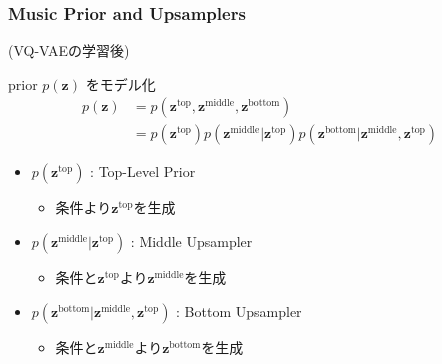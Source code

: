 \documentclass[dvipdfmx]{beamer}
\begin{document}
\begin{frame}
    \frametitle{Music Prior and Upsamplers}
    (VQ-VAEの学習後)
    \vspace{\baselineskip}

    prior $p(\bm{z})$ をモデル化
    \begin{align}
        p(\bm{z}) &= p(\bm{z}^{\mathrm{top}}, \bm{z}^{\mathrm{middle}}, \bm{z}^{\mathrm{bottom}}) \\
        &= p(\bm{z}^{\mathrm{top}}) p(\bm{z}^{\mathrm{middle}} | \bm{z}^{\mathrm{top}}) p(\bm{z}^{\mathrm{bottom}} | \bm{z}^{\mathrm{middle}}, \bm{z}^{\mathrm{top}})
    \end{align}

    \begin{itemize}
        \item $p(\bm{z}^{\mathrm{top}})$ : Top-Level Prior
        \begin{itemize}
            \item 条件より$\bm{z}^{\mathrm{top}}$を生成
        \end{itemize}
        \vspace{0.5\baselineskip}
        \item $p(\bm{z}^{\mathrm{middle}} | \bm{z}^{\mathrm{top}})$ : Middle Upsampler
        \begin{itemize}
            \item 条件と$\bm{z}^{\mathrm{top}}$より$\bm{z}^{\mathrm{middle}}$を生成
        \end{itemize}
        \vspace{0.5\baselineskip}
        \item $p(\bm{z}^{\mathrm{bottom}} | \bm{z}^{\mathrm{middle}}, \bm{z}^{\mathrm{top}})$ : Bottom Upsampler
        \begin{itemize}
            \item 条件と$\bm{z}^{\mathrm{middle}}$より$\bm{z}^{\mathrm{bottom}}$を生成
        \end{itemize}
    \end{itemize}
\end{frame}
\end{document}
